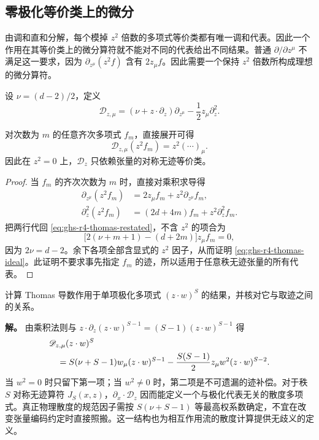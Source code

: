 \subsection{零极化等价类上的微分}

由调和直和分解，每个模掉 $z^2$ 倍数的多项式等价类都有唯一调和代表。因此一个作用在其等价类上的微分算符就不能对不同的代表给出不同结果。普通 $\partial/\partial z^\mu$ 不满足这一要求，因为 $\partial_{z^\mu}(z^2f)$ 含有 $2z_\mu f$。因此需要一个保持 $z^2$ 倍数所构成理想的微分算符。

\begin{definition}[Thomas 导数]
设 $\nu=(d-2)/2$，定义
\begin{equation}\label{eq:ghs-r4-thomas-restated}
 \mathscr D_{z,\mu}=\left(\nu+z\cdot\partial_z\right)\partial_{z^\mu}
 -\frac12z_\mu\partial_z^2.
\end{equation}
\end{definition}

\begin{proposition}
对次数为 $m$ 的任意齐次多项式 $f_m$，直接展开可得
\begin{equation}\label{eq:ghs-r4-thomas-ideal}
 \mathscr D_{z,\mu}(z^2f_m)=z^2(\cdots)_\mu.
\end{equation}
因此在 $z^2=0$ 上，$\mathscr D_z$ 只依赖张量的对称无迹等价类。
\end{proposition}
\begin{proof}
当 $f_m$ 的齐次次数为 $m$ 时，直接对乘积求导得
\begin{align*}
 \partial_{z^\mu}(z^2f_m)&=2z_\mu f_m+z^2\partial_{z^\mu}f_m,\\
 \partial_z^2(z^2f_m)&=(2d+4m)f_m+z^2\partial_z^2f_m.
\end{align*}
把两行代回 \cref{eq:ghs-r4-thomas-restated}，不含 $z^2$ 的项合为
\begin{equation*}
 \bigl[2(\nu+m+1)-(d+2m)\bigr]z_\mu f_m=0,
\end{equation*}
因为 $2\nu=d-2$。余下各项全部含显式的 $z^2$ 因子，从而证明 \cref{eq:ghs-r4-thomas-ideal}。此证明不要求事先指定 $f_m$ 的迹，所以适用于任意秩无迹张量的所有代表。
\end{proof}

\begin{example}
计算 Thomas 导数作用于单项极化多项式 $(z\cdot w)^S$ 的结果，并核对它与取迹之间的关系。

\textbf{解。} 由乘积法则与 $z\cdot\partial_z(z\cdot w)^{S-1}=(S-1)(z\cdot w)^{S-1}$ 得
\begin{align}\label{eq:ghs-r4-thomas-action}
 &\mathscr D_{z,\mu}(z\cdot w)^S\\
 &\quad=S(\nu+S-1)w_\mu(z\cdot w)^{S-1}
 -\frac{S(S-1)}2z_\mu w^2(z\cdot w)^{S-2}.\notag
\end{align}
当 $w^2=0$ 时只留下第一项；当 $w^2\ne0$ 时，第二项是不可遗漏的迹补偿。对于秩 $S$ 对称无迹算符 $J_S(x,z)$，$\partial_x\cdot\mathscr D_z$ 因而能定义一个与极化代表无关的散度多项式。真正物理散度的规范因子需按 $S(\nu+S-1)$ 等最高权系数确定，不宜在改变张量编码约定时直接照搬。这一结构也为相互作用流的散度计算提供无歧义的定义。
\end{example}


